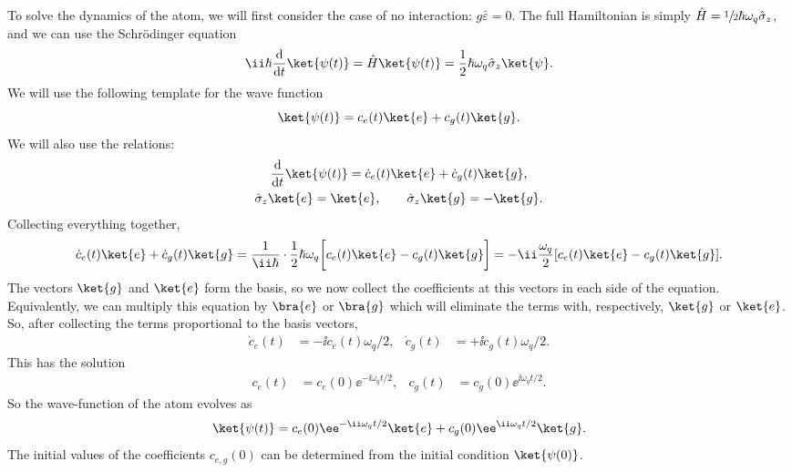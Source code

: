 \documentclass[fontsize=9pt,bookmarkpackage=false]{scrartcl}
\renewcommand{\hbar}{\hslash}
\begin{document}
To solve the dynamics of the atom, we will first consider the case of no interaction: $g \bar \varepsilon = 0$.
The full Hamiltonian is simply $\hat H = \sfrac 12 \hbar \omega_q \hat \sigma_z$, and we can use the Schrödinger equation
\begin{equation}
  \ii \hbar \diff{}{t } \ket{ \psi (t) } = \hat H \ket{ \psi (t) }
  =
  \frac 12 \hbar \omega_q \hat \sigma_z \ket{ \psi }.
\end{equation}
We will use the following template for the wave function
\begin{equation}
  \ket{ \psi (t) } = c_e (t) \ket{ e } + c_g (t) \ket{ g }.
\end{equation}
We will also use the relations:
\begin{gather}
  \diff{}{t } \ket{ \psi (t) }
  = \dot c_e (t) \ket{ e }
  + \dot c_g (t) \ket{ g },
  \\
  \hat \sigma_z \ket{ e } = \ket{ e },
  \qquad
  \hat \sigma_z \ket{ g } = - \ket{ g }.
\end{gather}
Collecting everything together,
\begin{equation}
  \dot c_e (t) \ket{ e } + \dot c_g (t) \ket {g }
  =
  \frac{ 1 }{ \ii \hbar } \cdot \frac 12 \hbar \omega_q
  \bigg[ c_e (t)\ket{ e } - c_g (t)\ket{ g } \bigg]
  =
  - \ii \frac{ \omega_q }{ 2 } [ c_e (t) \ket{ e } - c_g (t ) \ket { g } ].
\end{equation}
The vectors $\ket{g}$ and $\ket{e}$ form the basis, so we now collect the coefficients at this vectors in each side of the equation.
Equivalently, we can multiply this equation by $\bra{e}$ or $\bra{g}$ which will eliminate the terms with, respectively, $\ket{g}$ or $\ket{e}$.
So, after collecting the terms proportional to the basis vectors,
\begin{align}
  \dot c_e (t) & = - \ii c_e(t) \omega_q / 2 ,
  &
  \dot c_g (t) & = + \ii c_g(t) \omega_q / 2 .
\end{align}
This has the solution
\begin{align}
  c_e (t) & = c_e (0) \ee^{ - \ii \omega_q t / 2 },
  &
  c_g (t) & = c_g (0) \ee^{ \ii \omega_q t / 2 }.
\end{align}
So the wave-function of the atom evolves as
\begin{equation}
  \label{eq:qubit:nocoupling}
  \ket{ \psi (t) }
  =
  c_e (0) \ee^{ - \ii \omega_q t / 2 } \ket{ e }
  +
  c_g (0) \ee^{ \ii \omega_q t / 2 } \ket{ g }.
\end{equation}
The initial values of the coefficients $c_{e,g }(0)$ can be determined from the initial condition $\ket{ \psi (0)}$.
\end{document}
